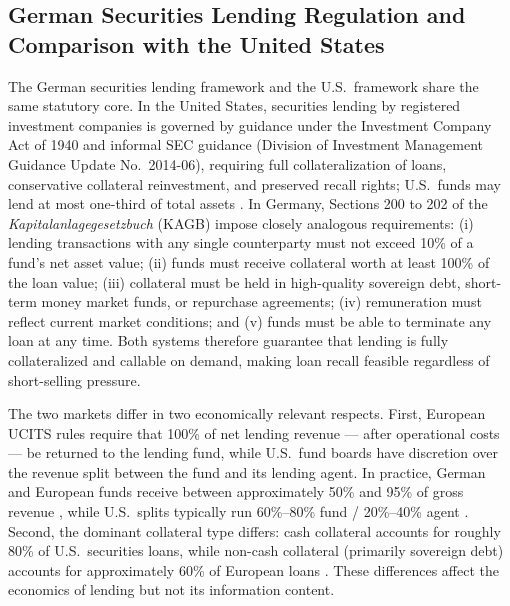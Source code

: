
\subsection{German Securities Lending Regulation and Comparison with the United States}

The German securities lending framework and the U.S.\ framework share the same statutory core. In the United States, securities lending by registered investment companies is governed by guidance under the Investment Company Act of 1940 and informal SEC guidance (Division of Investment Management Guidance Update No.\ 2014-06), requiring full collateralization of loans, conservative collateral reinvestment, and preserved recall rights; U.S.\ funds may lend at most one-third of total assets \citep{Honkanen2025}. In Germany, Sections 200 to 202 of the \textit{Kapitalanlagegesetzbuch} (KAGB) impose closely analogous requirements: (i) lending transactions with any single counterparty must not exceed 10\% of a fund's net asset value; (ii) funds must receive collateral worth at least 100\% of the loan value; (iii) collateral must be held in high-quality sovereign debt, short-term money market funds, or repurchase agreements; (iv) remuneration must reflect current market conditions; and (v) funds must be able to terminate any loan at any time. Both systems therefore guarantee that lending is fully collateralized and callable on demand, making loan recall feasible regardless of short-selling pressure.

The two markets differ in two economically relevant respects. First, European UCITS rules require that 100\% of net lending revenue --- after operational costs --- be returned to the lending fund, while U.S.\ fund boards have discretion over the revenue split between the fund and its lending agent. In practice, German and European funds receive between approximately 50\% and 95\% of gross revenue \citep{voicu_prache:2019}, while U.S.\ splits typically run 60\%--80\% fund / 20\%--40\% agent \citep{EvansFerreiraPrado2017}. Second, the dominant collateral type differs: cash collateral accounts for roughly 80\% of U.S.\ securities loans, while non-cash collateral (primarily sovereign debt) accounts for approximately 60\% of European loans \citep[Financial Stability Board]{jank_smajlbegovic:2015}. These differences affect the economics of lending but not its information content.

